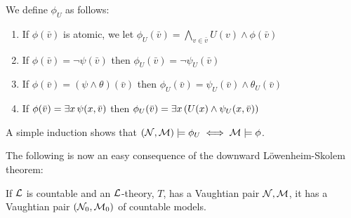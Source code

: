 We define \(\phi_U\) as follows:
\begin{enumerate}
\item If \(\phi(\bar{v})\) is atomic, we let \(\phi_U(\bar{v}) = \bigwedge\limits_{v \in \bar{v}}U(v) \land \phi(\bar{v})\)
\item If \(\phi(\bar{v}) = \neg \psi(\bar{v})\) then \(\phi_U(\bar{v}) = \neg \psi_U(\bar{v})\)
\item If \(\phi(\bar{v}) = (\psi \land \theta)(\bar{v})\) then \(\phi_U(\bar{v}) = \psi_U(\bar{v}) \land \theta_U(\bar{v})\)
\item If \(\phi(\bar{v}) = \exists x \, \psi(x, \bar{v})\) then \(\phi_U(\bar{v}) = \exists x\, (U(x) \land \psi_U(x, \bar{v}))\)
\end{enumerate}
A simple induction shows that \((\mathcal{N}, \mathcal{M}) \models \phi_U \iff \mathcal{M} \models \phi\).

The following is now an easy consequence of the downward L\"owenheim-Skolem theorem:

\begin{theorem}\label{theorem_countable_vaughtian_pairs}
If \(\mathcal{L}\) is countable and an \(\mathcal{L}\)-theory, \(T\), has a Vaughtian pair \(\mathcal{N}, \mathcal{M}\), it has a Vaughtian pair \((\mathcal{N}_0, \mathcal{M}_0)\) of countable models. 
\end{theorem}

